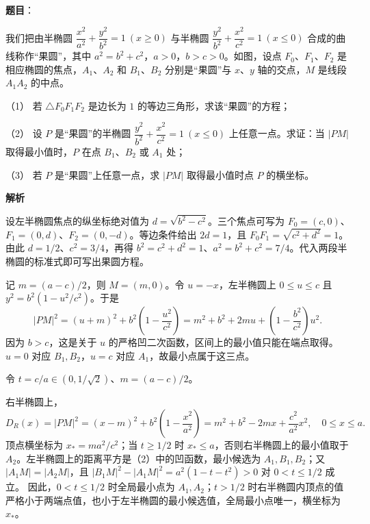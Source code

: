 \begin{answer}

\textbf{题目}：

我们把由半椭圆 $\dfrac{x^2}{a^2}+\dfrac{y^2}{b^2}=1\ (x\geqslant0)$ 与半椭圆 $\dfrac{y^2}{b^2}+\dfrac{x^2}{c^2}=1\ (x\leqslant0)$ 合成的曲线称作“果圆”，其中 $a^2=b^2+c^2$，$a>0$，$b>c>0$。如图，设点 $F_0$、$F_1$、$F_2$ 是相应椭圆的焦点，$A_1$、$A_2$ 和 $B_1$、$B_2$ 分别是“果圆”与 $x$、$y$ 轴的交点，$M$ 是线段 $A_1A_2$ 的中点。

（1） 若 $\triangle F_0F_1F_2$ 是边长为 $1$ 的等边三角形，求该“果圆”的方程；

（2） 设 $P$ 是“果圆”的半椭圆 $\dfrac{y^2}{b^2}+\dfrac{x^2}{c^2}=1\ (x\leqslant0)$ 上任意一点。求证：当 $|PM|$ 取得最小值时，$P$ 在点 $B_1$、$B_2$ 或 $A_1$ 处；

（3） 若 $P$ 是“果圆”上任意一点，求 $|PM|$ 取得最小值时点 $P$ 的横坐标。
\nopagebreak[4]
\begin{center}\end{center}
\nopagebreak[4]
\textbf{解析}


设左半椭圆焦点的纵坐标绝对值为 $d=\sqrt{b^2-c^2}$。三个焦点可写为 $F_0=(c,0)$、$F_1=(0,d)$、$F_2=(0,-d)$。等边条件给出 $2d=1$，且 $F_0F_1=\sqrt{c^2+d^2}=1$。由此 $d=1/2$、$c^2=3/4$，再得 $b^2=c^2+d^2=1$、$a^2=b^2+c^2=7/4$。代入两段半椭圆的标准式即可写出果圆方程。


记 $m=(a-c)/2$，则 $M=(m,0)$。令 $u=-x$，左半椭圆上 $0\le u\le c$ 且 $y^2=b^2(1-u^2/c^2)$。于是
\nopagebreak[4]
\[
|PM|^2=(u+m)^2+b^2\left(1-\frac{u^2}{c^2}\right)
=m^2+b^2+2mu+\left(1-\frac{b^2}{c^2}\right)u^2.
\]
因为 $b>c$，这是关于 $u$ 的严格凹二次函数，区间上的最小值只能在端点取得。$u=0$ 对应 $B_1,B_2$，$u=c$ 对应 $A_1$，故最小点属于这三点。


令 $t=c/a\in(0,1/\sqrt2)$、$m=(a-c)/2$。

右半椭圆上，
\nopagebreak[4]
\[
D_R(x)=|PM|^2=(x-m)^2+b^2\left(1-\frac{x^2}{a^2}\right)
=m^2+b^2-2mx+\frac{c^2}{a^2}x^2,\quad 0\le x\le a.
\]
顶点横坐标为 $x_*=ma^2/c^2$；当 $t\ge1/2$ 时 $x_*\le a$，否则右半椭圆上的最小值取于 $A_2$。左半椭圆上的距离平方是（2）中的凹函数，最小候选为 $A_1,B_1,B_2$；又 $|A_1M|=|A_2M|$，且 $|B_1M|^2-|A_1M|^2=a^2(1-t-t^2)>0$ 对 $0<t\le1/2$ 成立。
因此，$0<t\le1/2$ 时全局最小点为 $A_1,A_2$；$t>1/2$ 时右半椭圆内顶点的值严格小于两端点值，也小于左半椭圆的最小候选值，全局最小点唯一，横坐标为 $x_*$。


\end{answer}
